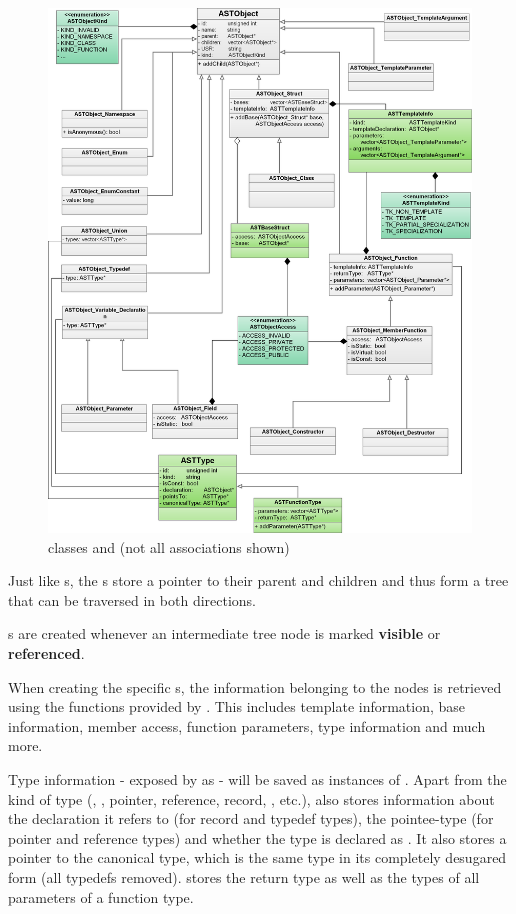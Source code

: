 \begin{figure}[p] %
	\centering
		\includegraphics[scale=0.2]{Images/ASTObjectUML.png}
	\caption{ classes and  (not all associations shown)}
	\label{fig:ASTObjectUML}
\end{figure}

\newpage
Just like s, the s store a pointer to their parent and children and thus form a tree that can be traversed in both directions.

s are created whenever an intermediate tree node is marked \textbf{visible} or \textbf{referenced}.

When creating the specific s, the information belonging to the nodes is retrieved using the functions provided by . This includes template information, base information, member access, function parameters, type information and much more.

Type information - exposed by  as  - will be saved as instances of . Apart from the kind of type (, , pointer, reference, record, , etc.),  also stores information about the declaration  it refers to (for record and typedef types), the pointee-type (for pointer and reference types) and whether the type is declared as . It also stores a pointer to the canonical type, which is the same type in its completely desugared form (all typedefs removed).  stores the return type as well as the types of all parameters of a function type.

